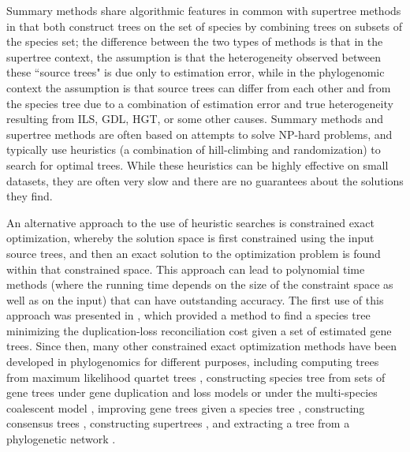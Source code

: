 Summary methods  share algorithmic features in common with supertree methods in that both construct trees on the set of species by combining trees on subsets of the species set; the difference between the two types of methods is that in the supertree context, the assumption is that the heterogeneity observed between these ``source trees" is due only to estimation error, while in the phylogenomic context the assumption is that source trees can differ from each other and from the species tree due to a combination of estimation error and true heterogeneity resulting from ILS, GDL, HGT, or some other causes. 
Summary methods and supertree methods are often based on attempts to solve NP-hard problems, and typically use heuristics  (a combination of hill-climbing and randomization) to search for optimal trees.
While these heuristics can be highly effective on small datasets, they are often very slow 
and there are no guarantees about the solutions they find.

An alternative approach to the use of heuristic searches is constrained exact optimization, whereby the solution space is first constrained using the input source trees, and then  an exact solution  to the optimization problem is found within that constrained space.
This approach can lead to polynomial time methods (where the running time depends on the size of the constraint space as well as on the input) that can have outstanding accuracy.
The first use of this approach was presented in   \cite{hallett2000new}, which provided a method to find a species tree minimizing the duplication-loss reconciliation cost given a set of estimated gene trees. 
Since then, many other constrained exact optimization methods have been developed in phylogenomics for different purposes, including  computing trees from maximum likelihood quartet trees \cite{bryant2001constructing}, constructing species tree  from sets of gene trees under gene duplication and loss models  \cite{bayzid2013inferring} or under the multi-species coalescent model \cite{ThanNakhleh2009,yu2011algorithms,mirarab2014astral,mirarab2015astral}, improving gene trees given a species tree  \cite{szollosi2013efficient}, constructing consensus trees \cite{bryant2001constructing}, 
constructing supertrees \cite{vachaspati2017fastrfs},  and extracting a tree from a phylogenetic network \cite{bryant2001constructing}.

 

